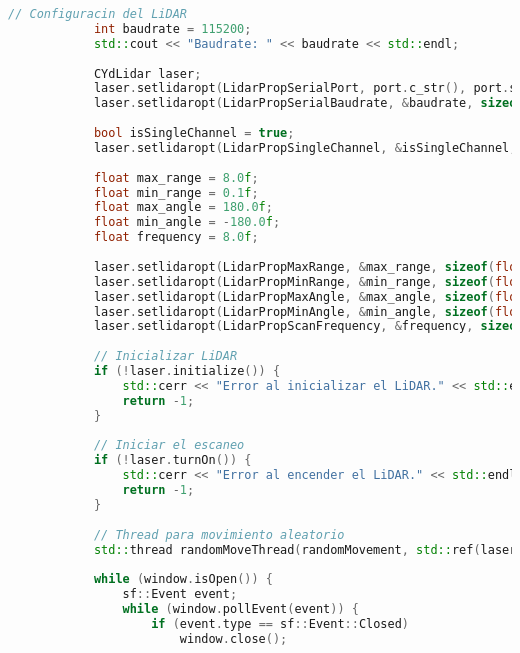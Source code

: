\begin{lstlisting}[language={C++}, caption={Segundo ajuste de c\'odigo}, label={SegundoAjuste}]
            // Configuracin del LiDAR
            int baudrate = 115200;
            std::cout << "Baudrate: " << baudrate << std::endl;
        
            CYdLidar laser;
            laser.setlidaropt(LidarPropSerialPort, port.c_str(), port.size());
            laser.setlidaropt(LidarPropSerialBaudrate, &baudrate, sizeof(int));
        
            bool isSingleChannel = true;
            laser.setlidaropt(LidarPropSingleChannel, &isSingleChannel, sizeof(bool));
        
            float max_range = 8.0f;
            float min_range = 0.1f;
            float max_angle = 180.0f;
            float min_angle = -180.0f;
            float frequency = 8.0f;
        
            laser.setlidaropt(LidarPropMaxRange, &max_range, sizeof(float));
            laser.setlidaropt(LidarPropMinRange, &min_range, sizeof(float));
            laser.setlidaropt(LidarPropMaxAngle, &max_angle, sizeof(float));
            laser.setlidaropt(LidarPropMinAngle, &min_angle, sizeof(float));
            laser.setlidaropt(LidarPropScanFrequency, &frequency, sizeof(float));
        
            // Inicializar LiDAR
            if (!laser.initialize()) {
                std::cerr << "Error al inicializar el LiDAR." << std::endl;
                return -1;
            }
        
            // Iniciar el escaneo
            if (!laser.turnOn()) {
                std::cerr << "Error al encender el LiDAR." << std::endl;
                return -1;
            }
        
            // Thread para movimiento aleatorio
            std::thread randomMoveThread(randomMovement, std::ref(laser));
        
            while (window.isOpen()) {
                sf::Event event;
                while (window.pollEvent(event)) {
                    if (event.type == sf::Event::Closed)
                        window.close();
        

\end{lstlisting}
